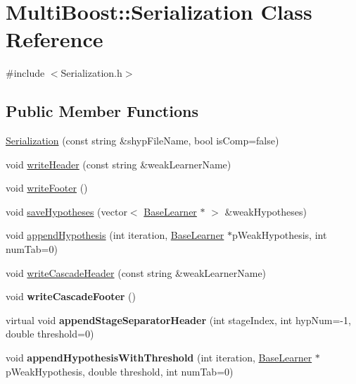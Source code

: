 \hypertarget{classMultiBoost_1_1Serialization}{\section{Multi\-Boost\-:\-:Serialization Class Reference}
\label{classMultiBoost_1_1Serialization}
}


{\ttfamily \#include $<$Serialization.\-h$>$}

\subsection*{Public Member Functions}
\begin{DoxyCompactItemize}
\item 
\hyperlink{classMultiBoost_1_1Serialization_a282b01f41daeda1637082b84af2cdfcb}{Serialization} (const string \&shyp\-File\-Name, bool is\-Comp=false)
\item 
void \hyperlink{classMultiBoost_1_1Serialization_ac8ebe66a2e9ecd5553cbca64bddbabf5}{write\-Header} (const string \&weak\-Learner\-Name)
\item 
void \hyperlink{classMultiBoost_1_1Serialization_ac906f5e085ada6420af345ca82d5d83e}{write\-Footer} ()
\item 
void \hyperlink{classMultiBoost_1_1Serialization_ad8697b389ecff656c3b007f2282462a4}{save\-Hypotheses} (vector$<$ \hyperlink{classMultiBoost_1_1BaseLearner}{Base\-Learner} $\ast$ $>$ \&weak\-Hypotheses)
\item 
void \hyperlink{classMultiBoost_1_1Serialization_a24e67db8a0a7874a43a49c6aadfaa984}{append\-Hypothesis} (int iteration, \hyperlink{classMultiBoost_1_1BaseLearner}{Base\-Learner} $\ast$p\-Weak\-Hypothesis, int num\-Tab=0)
\item 
void \hyperlink{classMultiBoost_1_1Serialization_aabf599af41e56e50dac18495ce6c0285}{write\-Cascade\-Header} (const string \&weak\-Learner\-Name)
\item 
\hypertarget{classMultiBoost_1_1Serialization_a4c7bfea862d1700a16632e9435725ee5}{void {\bfseries write\-Cascade\-Footer} ()}\label{classMultiBoost_1_1Serialization_a4c7bfea862d1700a16632e9435725ee5}

\item 
\hypertarget{classMultiBoost_1_1Serialization_a9faf49587967212188f26e90ed7c9369}{virtual void {\bfseries append\-Stage\-Separator\-Header} (int stage\-Index, int hyp\-Num=-\/1, double threshold=0)}\label{classMultiBoost_1_1Serialization_a9faf49587967212188f26e90ed7c9369}

\item 
\hypertarget{classMultiBoost_1_1Serialization_a8eb1b529fe742e4fdf4163e0ac38e229}{void {\bfseries append\-Hypothesis\-With\-Threshold} (int iteration, \hyperlink{classMultiBoost_1_1BaseLearner}{Base\-Learner} $\ast$p\-Weak\-Hypothesis, double threshold, int num\-Tab=0)}\label{classMultiBoost_1_1Serialization_a8eb1b529fe742e4fdf4163e0ac38e229}

\end{DoxyCompactItemize}
